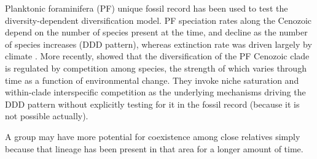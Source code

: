 Planktonic foraminifera (PF) unique fossil record has been used to test the diversity-dependent diversification model. PF speciation rates along the Cenozoic depend on the number of species present at the time, and decline as the number of species increases (DDD pattern), whereas extinction rate was driven largely by climate \cite{ezard2011interplay}. %
More recently, \cite{ezard2016ecolet} showed that the diversification of the PF Cenozoic clade is regulated by competition among species, the strength of which varies through time as a function of environmental change. They invoke niche saturation and within-clade interspecific competition as the underlying mechanisms driving the DDD pattern without explicitly testing for it in the fossil record (because it is not possible actually).

A group may have more potential for coexistence among close relatives simply because that lineage has been present in that area for a longer amount of time.